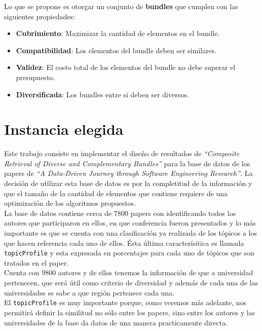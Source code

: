 Lo que se propone es otorgar un conjunto de \textbf{bundles} que cumplen con las siguientes propiedades:
\begin{itemize}
  \item \textbf{Cubrimiento}: Maximizar la cantidad de elementos en el bundle.
  \item \textbf{Compatibilidad}: Los elementos del bundle deben ser similares.
  \item \textbf{Validez}: El costo total de los elementos del bundle no debe superar el presupuesto.
  \item \textbf{Diversificada}: Los bundles entre si deben ser diversos.
\end{itemize}

\section{Instancia elegida}
Este trabajo consiste en implementar el diseño de resultados de \textit{\textquotedblleft Composite Retrieval of Diverse and Complementary Bundles\textquotedblright}\cite{compositeRetrival} para la base de datos de los papers de \textit{\textquotedblleft A Data-Driven Journey through Software Engineering Research\textquotedblright}\cite{dataDrive}.
La decisión de utilizar esta base de datos es por la completitud de la información y que el tamaño de la cantidad de elementos
que contiene requiere de una optimización de los algoritmos propuestos.\\
La base de datos contiene cerca de $7800$ papers con identificando todos los autores que participaron en ellos, en que conferencia fueron presentados y lo más importante es que se cuenta con una clasificación ya realizada de los tópicos a los que hacen referencia cada uno de ellos. Ésta última caracterísitica es llamada \texttt{topicProfile} y esta expresada en porcentajes para cada uno de tópicos que son tratados en el paper.\\
Cuenta con $9800$ autores y de ellos tenemos la información de que a universidad pertenecen, que será útil como criterio de diversidad y además de cada una de las universidades se sabe a que región pertenece cada una.\\
El \texttt{topicProfile} es muy importante porque, como veremos más adelante, nos permitirá definir la similitud no sólo entre los papers, sino entre los autores y las universidades de la base da datos de una manera practicamente directa.
